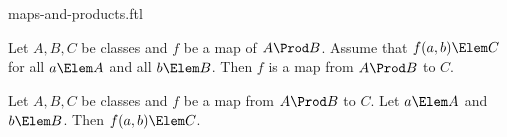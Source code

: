 \documentclass{stex}
\begin{document}
\begin{smodule}{maps-and-products.ftl}


\begin{proposition*}[forthel]
  Let $A, B, C$ be classes and $f$ be a map of $A \Prod B$.
  Assume that $f(a,b) \Elem C$ for all $a \Elem A$ and all $b \Elem B$.
  Then $f$ is a map from $A \Prod B$ to $C$.
\end{proposition*}

\begin{proposition*}[forthel]
  Let $A, B, C$ be classes and $f$ be a map from $A \Prod B$ to $C$.
  Let $a \Elem A$ and $b \Elem B$.
  Then $f(a,b) \Elem C$.
\end{proposition*}

\end{smodule}
\end{document}
